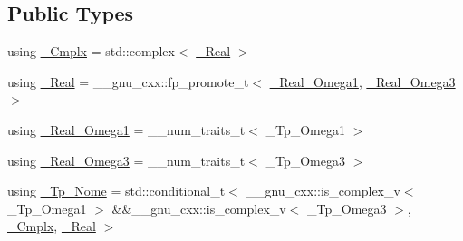 \subsection*{Public Types}
\begin{DoxyCompactItemize}
\item 
using \hyperlink{structstd_1_1____detail_1_1____jacobi__lattice__t_a77e286c37544d6ba5e4fb5542d3aad5f}{\+\_\+\+Cmplx} = std\+::complex$<$ \hyperlink{structstd_1_1____detail_1_1____jacobi__lattice__t_afdf4a474bd195f7b6062b4782202adc7}{\+\_\+\+Real} $>$
\item 
using \hyperlink{structstd_1_1____detail_1_1____jacobi__lattice__t_afdf4a474bd195f7b6062b4782202adc7}{\+\_\+\+Real} = \+\_\+\+\_\+gnu\+\_\+cxx\+::fp\+\_\+promote\+\_\+t$<$ \hyperlink{structstd_1_1____detail_1_1____jacobi__lattice__t_abf268d5ebea22a011ad5d89dd5781eab}{\+\_\+\+Real\+\_\+\+Omega1}, \hyperlink{structstd_1_1____detail_1_1____jacobi__lattice__t_a7f2828706e5ac28bddfb0a8e44c1fed3}{\+\_\+\+Real\+\_\+\+Omega3} $>$
\item 
using \hyperlink{structstd_1_1____detail_1_1____jacobi__lattice__t_abf268d5ebea22a011ad5d89dd5781eab}{\+\_\+\+Real\+\_\+\+Omega1} = \+\_\+\+\_\+num\+\_\+traits\+\_\+t$<$ \+\_\+\+Tp\+\_\+\+Omega1 $>$
\item 
using \hyperlink{structstd_1_1____detail_1_1____jacobi__lattice__t_a7f2828706e5ac28bddfb0a8e44c1fed3}{\+\_\+\+Real\+\_\+\+Omega3} = \+\_\+\+\_\+num\+\_\+traits\+\_\+t$<$ \+\_\+\+Tp\+\_\+\+Omega3 $>$
\item 
using \hyperlink{structstd_1_1____detail_1_1____jacobi__lattice__t_a0de534a75abb780f607e9d3cd8b84e42}{\+\_\+\+Tp\+\_\+\+Nome} = std\+::conditional\+\_\+t$<$ \+\_\+\+\_\+gnu\+\_\+cxx\+::is\+\_\+complex\+\_\+v$<$ \+\_\+\+Tp\+\_\+\+Omega1 $>$ \&\&\+\_\+\+\_\+gnu\+\_\+cxx\+::is\+\_\+complex\+\_\+v$<$ \+\_\+\+Tp\+\_\+\+Omega3 $>$, \hyperlink{structstd_1_1____detail_1_1____jacobi__lattice__t_a77e286c37544d6ba5e4fb5542d3aad5f}{\+\_\+\+Cmplx}, \hyperlink{structstd_1_1____detail_1_1____jacobi__lattice__t_afdf4a474bd195f7b6062b4782202adc7}{\+\_\+\+Real} $>$
\end{DoxyCompactItemize}
